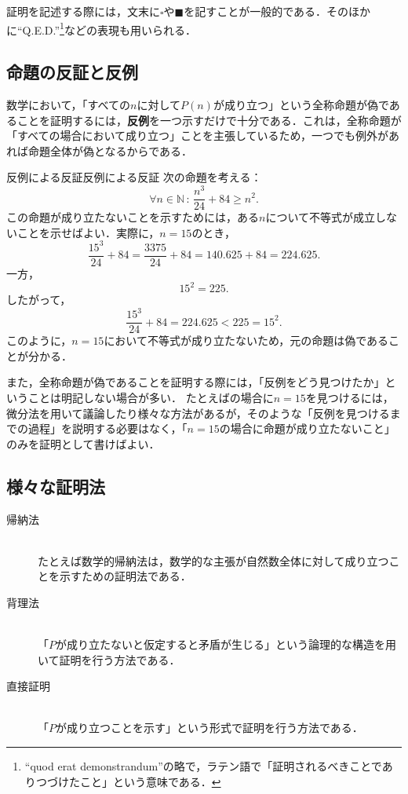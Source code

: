 \begin{mycolumn}
  証明を記述する際には，文末に$\square$や$\blacksquare$を記すことが一般的である．そのほかに``Q.E.D.''\footnote{``quod erat demonstrandum''の略で，ラテン語で「証明されるべきことでありつづけたこと」という意味である．}などの表現も用いられる．
\end{mycolumn}

\subsection{命題の反証と反例}

数学において，「すべての$n$に対して$P(n)$が成り立つ」という全称命題が偽であることを証明するには，\textbf{反例}を一つ示すだけで十分である．これは，全称命題が「すべての場合において成り立つ」ことを主張しているため，一つでも例外があれば命題全体が偽となるからである．

\begin{example}{反例による反証}{反例による反証}
  次の命題を考える：
  \[
    \forall n \in \mathbb{N}\, : \, \frac{n^3}{24} + 84 \geq n^2.
  \]
  この命題が成り立たないことを示すためには，ある$n$について不等式が成立しないことを示せばよい．実際に，$n = 15$のとき，
  \[
    \frac{15^3}{24} + 84 = \frac{3375}{24} + 84 = 140.625 + 84 = 224.625.
  \]
  一方，
  \[
    15^2 = 225.
  \]
  したがって，
  \[
    \frac{15^3}{24} + 84 = 224.625 < 225 = 15^2.
  \]
  このように，$n = 15$において不等式が成り立たないため，元の命題は偽であることが分かる．
\end{example}

また，全称命題が偽であることを証明する際には，「反例をどう見つけたか」ということは明記しない場合が多い．
たとえばの場合に$n=15$を見つけるには，微分法を用いて議論したり様々な方法があるが，そのような「反例を見つけるまでの過程」を説明する必要はなく，「$n=15$の場合に命題が成り立たないこと」のみを証明として書けばよい．

\subsection{様々な証明法}

\begin{description}
  \item[帰納法] \mbox{} \\
        たとえば数学的帰納法は，数学的な主張が自然数全体に対して成り立つことを示すための証明法である．
  \item[背理法] \mbox{} \\
        「$P$が成り立たないと仮定すると矛盾が生じる」という論理的な構造を用いて証明を行う方法である．
  \item[直接証明] \mbox{} \\
        「$P$が成り立つことを示す」という形式で証明を行う方法である．
\end{description}

